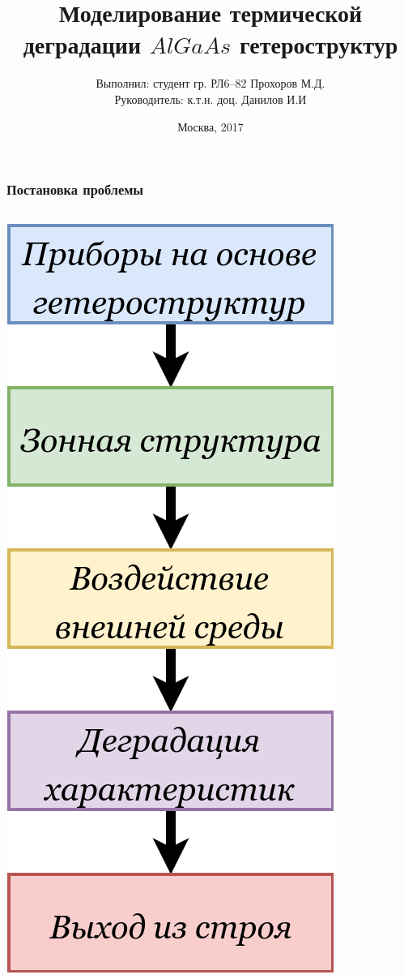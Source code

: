 \documentclass[10pt,pdf,hyperref={unicode},aspectratio={169}]{beamer}
\title{Моделирование термической деградации $AlGaAs$ гетероструктур}
\author[Прохоров М.Д.]{Выполнил: студент гр. РЛ6--82 Прохоров М.Д.\\ Руководитель: к.т.н. доц. Данилов И.И}
\date{Москва, 2017}
\institute[BMSTU]{МГТУ им. Н.Э.Баумана}
\begin{document}
\begin{frame}[plain]
	\titlepage
\end{frame} 

\begin{frame}
	\frametitle{Постановка проблемы}
	\begin{columns}
		\begin{center}
			\includegraphics[width=\textwidth]{assets/Trouble}

\end{center}
\end{columns}
\end{frame}
\end{document}
